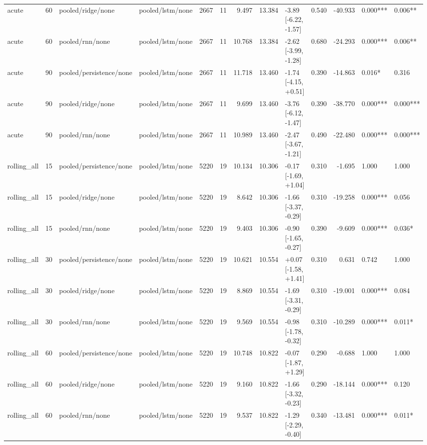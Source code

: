 \begin{tabular}{lrllrrrrlrrll}
acute & 60 & pooled/ridge/none & pooled/lstm/none & 2667 & 11 & 9.497 & 13.384 & -3.89 [-6.22, -1.57] & 0.540 & -40.933 & 0.000*** & 0.006** \\
acute & 60 & pooled/rnn/none & pooled/lstm/none & 2667 & 11 & 10.768 & 13.384 & -2.62 [-3.99, -1.28] & 0.680 & -24.293 & 0.000*** & 0.006** \\
acute & 90 & pooled/persistence/none & pooled/lstm/none & 2667 & 11 & 11.718 & 13.460 & -1.74 [-4.15, +0.51] & 0.390 & -14.863 & 0.016* & 0.316 \\
acute & 90 & pooled/ridge/none & pooled/lstm/none & 2667 & 11 & 9.699 & 13.460 & -3.76 [-6.12, -1.47] & 0.390 & -38.770 & 0.000*** & 0.000*** \\
acute & 90 & pooled/rnn/none & pooled/lstm/none & 2667 & 11 & 10.989 & 13.460 & -2.47 [-3.67, -1.21] & 0.490 & -22.480 & 0.000*** & 0.000*** \\
rolling_all & 15 & pooled/persistence/none & pooled/lstm/none & 5220 & 19 & 10.134 & 10.306 & -0.17 [-1.69, +1.04] & 0.310 & -1.695 & 1.000 & 1.000 \\
rolling_all & 15 & pooled/ridge/none & pooled/lstm/none & 5220 & 19 & 8.642 & 10.306 & -1.66 [-3.37, -0.29] & 0.310 & -19.258 & 0.000*** & 0.056 \\
rolling_all & 15 & pooled/rnn/none & pooled/lstm/none & 5220 & 19 & 9.403 & 10.306 & -0.90 [-1.65, -0.27] & 0.390 & -9.609 & 0.000*** & 0.036* \\
rolling_all & 30 & pooled/persistence/none & pooled/lstm/none & 5220 & 19 & 10.621 & 10.554 & +0.07 [-1.58, +1.41] & 0.310 & 0.631 & 0.742 & 1.000 \\
rolling_all & 30 & pooled/ridge/none & pooled/lstm/none & 5220 & 19 & 8.869 & 10.554 & -1.69 [-3.31, -0.29] & 0.310 & -19.001 & 0.000*** & 0.084 \\
rolling_all & 30 & pooled/rnn/none & pooled/lstm/none & 5220 & 19 & 9.569 & 10.554 & -0.98 [-1.78, -0.32] & 0.310 & -10.289 & 0.000*** & 0.011* \\
rolling_all & 60 & pooled/persistence/none & pooled/lstm/none & 5220 & 19 & 10.748 & 10.822 & -0.07 [-1.87, +1.29] & 0.290 & -0.688 & 1.000 & 1.000 \\
rolling_all & 60 & pooled/ridge/none & pooled/lstm/none & 5220 & 19 & 9.160 & 10.822 & -1.66 [-3.32, -0.23] & 0.290 & -18.144 & 0.000*** & 0.120 \\
rolling_all & 60 & pooled/rnn/none & pooled/lstm/none & 5220 & 19 & 9.537 & 10.822 & -1.29 [-2.29, -0.40] & 0.340 & -13.481 & 0.000*** & 0.011* \\

\end{tabular}
